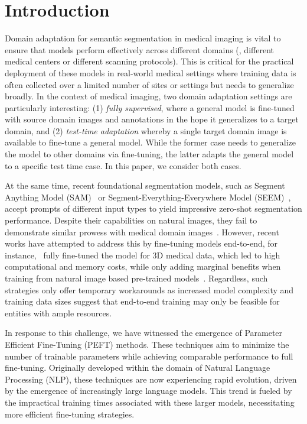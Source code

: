 \section{Introduction}
\label{sec:samda_introduction}

Domain adaptation for semantic segmentation in medical imaging is vital to ensure that models perform effectively across different domains (\eg, different medical centers or different scanning protocols). This is critical for the practical deployment of these models in real-world medical settings where training data is often collected over a limited number of sites or settings but needs to generalize broadly. In the context of medical imaging, two domain adaptation settings are particularly interesting: (1) {\it fully supervised}, where a general model is fine-tuned with source domain images and annotations in the hope it generalizes to a target domain, and (2) {\it test-time adaptation} whereby a single target domain image is available to fine-tune a general model. While the former case needs to generalize the model to other domains via fine-tuning, the latter adapts the general model to a specific test time case. In this paper, we consider both cases. 


At the same time, recent foundational segmentation models, such as Segment Anything Model (SAM)~ or Segment-Everything-Everywhere Model (SEEM)~, accept prompts of different input types to yield impressive zero-shot segmentation performance. Despite their capabilities on natural images, they fail to demonstrate similar prowess with medical domain images~. 
However, recent works have attempted to address this by fine-tuning models end-to-end, for instance,~ fully fine-tuned the model for 3D medical data, which led to high computational and memory costs, while only adding marginal benefits when training from natural image based pre-trained models~. Regardless, such strategies only offer temporary workarounds as increased model complexity and training data sizes suggest that end-to-end training may only be feasible for entities with ample resources.

In response to this challenge, we have witnessed the emergence of Parameter Efficient Fine-Tuning (PEFT) methods. These techniques aim to minimize the number of trainable parameters while achieving comparable performance to full fine-tuning. Originally developed within the domain of Natural Language Processing (NLP), these techniques are now experiencing rapid evolution, driven by the emergence of increasingly large language models. This trend is fueled by the impractical training times associated with these larger models, necessitating more efficient fine-tuning strategies. 

